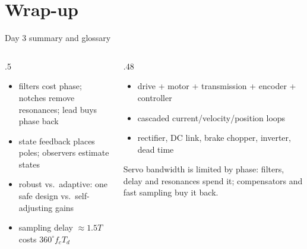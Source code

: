 \documentclass[aspectratio=169,10pt]{beamer}
\begin{document}
\section*{Wrap-up}
\begin{frame}{Day 3 summary and glossary}
\begin{columns}[T]
\begin{column}{.5\textwidth}
\begin{defbox}[Control]
\begin{itemize}\setlength\itemsep{.3mm}
\item filters cost phase; notches remove resonances; lead buys phase back
\item state feedback places poles; observers estimate states
\item robust vs.\ adaptive: one safe design vs.\ self-adjusting gains
\item sampling delay $\approx1.5T$ costs $360^\circ f_cT_d$
\end{itemize}
\end{defbox}
\end{column}
\begin{column}{.48\textwidth}
\begin{defbox}
\begin{itemize}\setlength\itemsep{.3mm}
\item drive + motor + transmission + encoder + controller
\item cascaded current/velocity/position loops
\item rectifier, DC link, brake chopper, inverter, dead time
\end{itemize}
\end{defbox}
\begin{keybox}
Servo bandwidth is limited by phase: filters, delay and resonances spend it; compensators and fast sampling buy it back.
\end{keybox}
\end{column}
\end{columns}
\end{frame}
\end{document}
